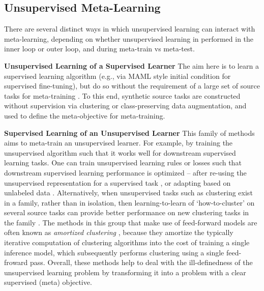\documentclass[10pt,journal,compsoc]{IEEEtran}
\newcommand{\keypoint}[1]{\vspace{0.1cm}\noindent\textbf{#1}\quad}
\begin{document}
\subsection{Unsupervised Meta-Learning} 
There are several distinct ways in which unsupervised learning can interact with meta-learning, depending on whether unsupervised learning in performed in the inner loop or outer loop, and during meta-train vs meta-test.
 

\keypoint{Unsupervised Learning of a Supervised Learner} The aim here is to learn a supervised learning algorithm (e.g., via MAML \cite{finn2017maml} style initial condition for supervised fine-tuning), but do so without the requirement of a large set of source tasks for meta-training \cite{hsu2018unsupervised,unsupervised2019khoda,antoniou2019assume}. To this end, synthetic source tasks are constructed without supervision via clustering or class-preserving data augmentation, and used to define the meta-objective for meta-training.
 

\keypoint{Supervised Learning of an Unsupervised Learner} This family of methods aims to meta-train an unsupervised learner. For example, by training the unsupervised algorithm such that it works well for downstream supervised learning tasks. One can train unsupervised learning rules \cite{metz2018meta} or losses \cite{antoniou2019learning,semifewmaml2018} such that downstream supervised learning performance is optimized -- after re-using the unsupervised representation for a supervised task \cite{metz2018meta}, or adapting based on unlabeled data \cite{antoniou2019learning,semifewmaml2018}. Alternatively, when unsupervised tasks such as clustering exist in a family, rather than in isolation, then learning-to-learn of `how-to-cluster' on several source tasks can provide better performance on new clustering tasks in the family \cite{jiang2019metalcluster,garg2018supervising,lee2019setTransformer,lee2019deepAmortizedClustering,pakman2019ncpAmortizedCluster}. The methods in this group that make use of feed-forward models are often known as \emph{amortized clustering} \cite{lee2019setTransformer,lee2019deepAmortizedClustering}, because they amortize the typically iterative computation of clustering algorithms into the cost of training a single inference model, which subsequently performs clustering using a single feed-froward pass. Overall, these methods help to deal with the ill-definedness of the unsupervised learning problem by transforming it into a problem with a clear supervised (meta) objective.
 
\end{document}
